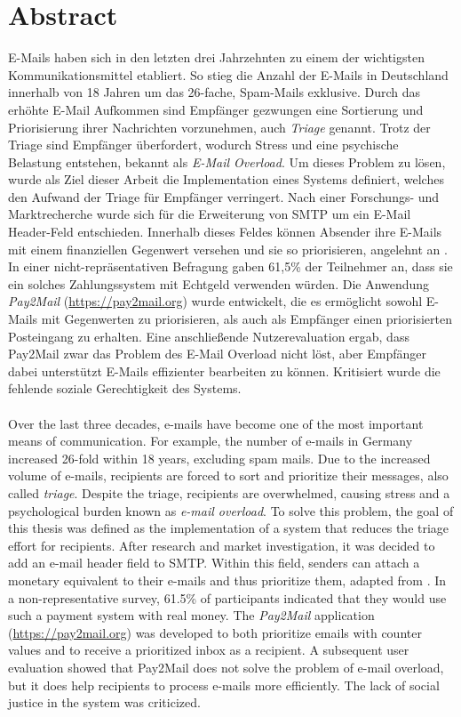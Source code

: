 
\chapter*{Abstract}
E-Mails haben sich in den letzten drei Jahrzehnten zu einem der wichtigsten Kommunikationsmittel etabliert. So stieg die Anzahl der E-Mails in Deutschland innerhalb von 18 Jahren um das 26-fache, Spam-Mails exklusive. Durch das erhöhte E-Mail Aufkommen sind Empfänger gezwungen eine Sortierung und Priorisierung ihrer Nachrichten vorzunehmen, auch \textit{Triage} genannt. Trotz der Triage sind Empfänger überfordert, wodurch Stress und eine psychische Belastung entstehen, bekannt als \textit{E-Mail Overload}. Um dieses Problem zu lösen, wurde als Ziel dieser Arbeit die Implementation eines Systems definiert, welches den Aufwand der Triage für Empfänger verringert. Nach einer Forschungs- und Marktrecherche wurde sich für die Erweiterung von SMTP um ein E-Mail Header-Feld entschieden. Innerhalb dieses Feldes können Absender ihre E-Mails mit einem finanziellen Gegenwert versehen und sie so priorisieren, angelehnt an \cite{Turner2003}. In einer nicht-repräsentativen Befragung gaben 61,5\% der Teilnehmer an, dass sie ein solches Zahlungssystem mit Echtgeld verwenden würden. Die Anwendung \textit{Pay2Mail} (\url{https://pay2mail.org}) wurde entwickelt, die es ermöglicht sowohl E-Mails mit Gegenwerten zu priorisieren, als auch als Empfänger einen priorisierten Posteingang zu erhalten. Eine anschließende Nutzerevaluation ergab, dass Pay2Mail zwar das Problem des E-Mail Overload nicht löst, aber Empfänger dabei unterstützt E-Mails effizienter bearbeiten zu können. Kritisiert wurde die fehlende soziale Gerechtigkeit des Systems.
\\ \\
Over the last three decades, e-mails have become one of the most important means of communication. For example, the number of e-mails in Germany increased 26-fold within 18 years, excluding spam mails. Due to the increased volume of e-mails, recipients are forced to sort and prioritize their messages, also called \textit{triage}. Despite the triage, recipients are overwhelmed, causing stress and a psychological burden known as \textit{e-mail overload}. To solve this problem, the goal of this thesis was defined as the implementation of a system that reduces the triage effort for recipients. After research and market investigation, it was decided to add an e-mail header field to SMTP. Within this field, senders can attach a monetary equivalent to their e-mails and thus prioritize them, adapted from \cite{Turner2003}. In a non-representative survey, 61.5\% of participants indicated that they would use such a payment system with real money. The \textit{Pay2Mail} application (\url{https://pay2mail.org}) was developed to both prioritize emails with counter values and to receive a prioritized inbox as a recipient. A subsequent user evaluation showed that Pay2Mail does not solve the problem of e-mail overload, but it does help recipients to process e-mails more efficiently. The lack of social justice in the system was criticized.
